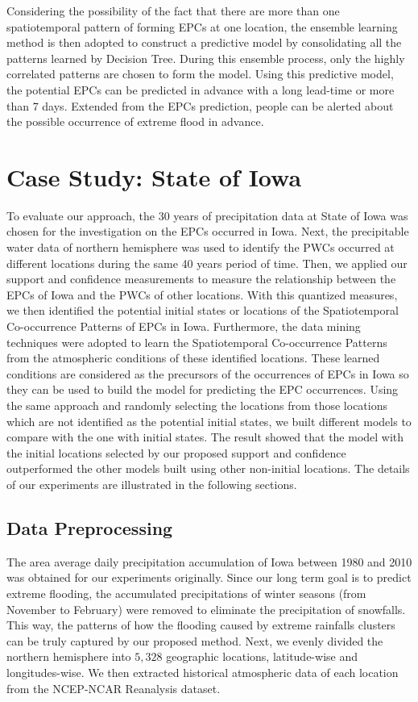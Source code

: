 \documentclass{acm_proc_article-sp}
\begin{document}
\newline 
Considering the possibility of the fact that there are more than one spatiotemporal pattern of forming EPCs at one location, the ensemble learning method is then adopted to construct a predictive model by consolidating all the patterns learned by Decision Tree. During this ensemble process, only the highly correlated patterns are chosen to form the model. Using this predictive model, the potential EPCs can be predicted in advance with a long lead-time or more than 7 days. Extended from the EPCs prediction, people can be alerted about the possible occurrence of extreme flood in advance.   

\section{Case Study: State of Iowa}
\label{sec:CaseStudy}
To evaluate our approach, the 30 years of precipitation data at State of Iowa was chosen for the investigation on the EPCs occurred in Iowa. Next, the precipitable water data of northern hemisphere was used to identify the PWCs occurred at different locations during the same 40 years period of time. Then, we applied our support and confidence measurements to measure the relationship between the EPCs of Iowa and the PWCs of other locations. With this quantized measures, we then identified the potential initial states or locations of the Spatiotemporal Co-occurrence Patterns of EPCs in Iowa. Furthermore, the data mining techniques were adopted to learn the Spatiotemporal Co-occurrence Patterns from the atmospheric conditions of these identified locations. 
\newline 
These learned conditions are considered as the precursors of the occurrences of EPCs in Iowa so they can be used to build the model for predicting the EPC occurrences. Using the same approach and randomly selecting the locations from those locations which are not identified as the potential initial states, we built different models to compare with the one with initial states. The result showed that the model with the initial locations selected by our proposed support and confidence outperformed the other models built using other non-initial locations. The details of our experiments are illustrated in the following sections. 
\subsection{Data Preprocessing}   
The area average daily precipitation accumulation of Iowa between 1980 and 2010 was obtained for our experiments originally. Since our long term goal is to predict extreme flooding, the accumulated precipitations of winter seasons (from November to February) were removed to eliminate the precipitation of snowfalls. This way, the patterns of how the flooding caused by extreme rainfalls clusters can be truly captured by our proposed method.     
\newline
Next, we evenly divided the northern hemisphere into $5,328$ geographic locations, latitude-wise and longitudes-wise. We then extracted historical atmospheric data of each location from the NCEP-NCAR Reanalysis dataset\cite{kalnay1996ncep}.       
\end{document}
